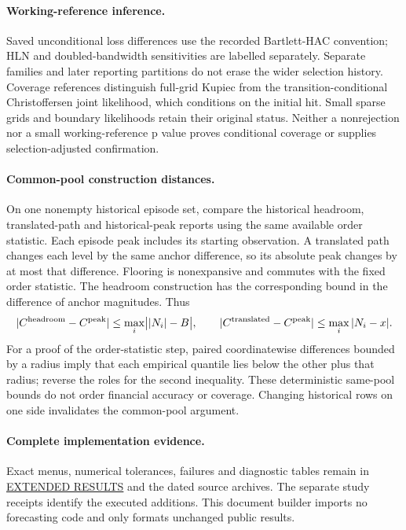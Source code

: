 \documentclass[11pt,a4paper]{article}
\begin{document}
\paragraph{Working-reference inference.}
Saved unconditional loss differences use the recorded Bartlett-HAC convention;
HLN and doubled-bandwidth sensitivities are labelled separately. Separate
families and later reporting partitions do not erase the wider selection
history. Coverage references distinguish full-grid Kupiec from the
transition-conditional Christoffersen joint likelihood, which conditions on
the initial hit. Small sparse grids and boundary likelihoods retain their
original status. Neither a nonrejection nor a small working-reference p value
proves conditional coverage or supplies selection-adjusted confirmation.

\paragraph{Common-pool construction distances.}
On one nonempty historical episode set, compare the historical headroom,
translated-path and historical-peak reports using the same available order
statistic. Each episode peak includes its starting observation. A translated
path changes each level by the same anchor difference, so its absolute peak
changes by at most that difference. Flooring is nonexpansive and commutes with
the fixed order statistic. The headroom construction has the corresponding
bound in the difference of anchor magnitudes. Thus
\[
|C^{\rm headroom}-C^{\rm peak}|\le\max_i\bigl||N_i|-B\bigr|,\qquad
|C^{\rm translated}-C^{\rm peak}|\le\max_i|N_i-x|.
\]
For a proof of the order-statistic step, paired coordinatewise differences
bounded by a radius imply that each empirical quantile lies below the other
plus that radius; reverse the roles for the second inequality. These
deterministic same-pool bounds do not order financial accuracy or coverage.
Changing historical rows on one side invalidates the common-pool argument.

\paragraph{Complete implementation evidence.}
Exact menus, numerical tolerances, failures and diagnostic tables remain in
\href{https://github.com/ByronLi0207/financial-mathematics-paper-20261020/blob/revision-v7-final/EXTENDED_RESULTS.md}{EXTENDED RESULTS} and the dated source archives.
The separate study receipts identify the executed additions. This document
builder imports no forecasting code and only formats unchanged public results.
\end{document}
